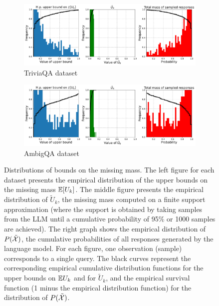 \begin{figure}[H]
  \centering
  \begin{subfigure}[b]{0.48\linewidth}
    \includegraphics[width=\textwidth]{trivia_qa_missing_mass_with_cdf.pdf}
    \caption*{TriviaQA dataset}
  \end{subfigure}
  \begin{subfigure}[b]{0.48\linewidth}
    \includegraphics[width=\textwidth]{ambig_qa_missing_mass_with_cdf.pdf}
    \caption*{AmbigQA dataset}
  \end{subfigure}
  \caption{Distributions of bounds on the missing mass. The left figure for each dataset presents the empirical distribution of the upper bounds on the missing mass $\mathbb{E}[U_k]$. %
    The middle figure presents the empirical distribution of $\tilde U_k$, the missing mass computed on a finite support approximation (where the support is obtained by taking samples from the LLM until a cumulative probability of 95\% or 1000 samples are achieved).
    The right graph shows the empirical distribution of $P(\tilde {{\mathcal{X}}})$, the cumulative probabilities of all responses generated by the language model. For each figure, one observation (sample) corresponds to a single query.
    The black curves represent the corresponding empirical cumulative distribution functions for the upper bounds on $\mathbb{E}{U_k}$ and for $\tilde U_k$, and the empirical survival function (1 minus the empirical distribution function) for the distribution of $P(\tilde {{\mathcal{X}}})$.
  }
  \label{fig:missing-mass}
\end{figure}
%
